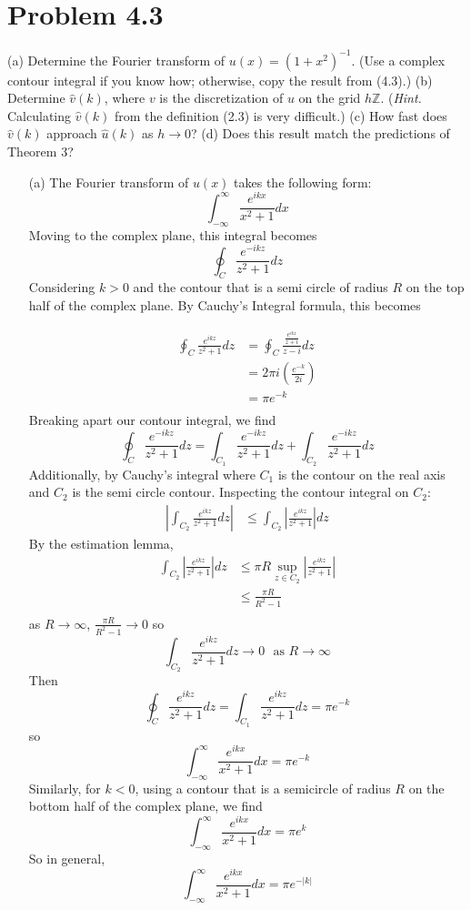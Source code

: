 \documentclass{article}
\begin{document}
\section*{Problem 4.3}
(a) Determine the Fourier transform of $u(x) = (1 + x^2)^{-1}$. (Use a complex contour integral if you know how; otherwise, copy the result from (4.3).) (b) Determine $\hat{v}(k)$, where $v$ is the discretization of $u$ on the grid $h\mathbb{Z}$. (\textit{Hint.} Calculating $\hat{v}(k)$ from the definition (2.3) is very difficult.) (c) How fast does $\hat{v}(k)$ approach $\hat{u}(k)$ as $h \to 0$? (d) Does this result match the predictions of Theorem 3?
\newline\newline
\begin{itemize}
    \item[(a)] The Fourier transform of $u(x)$ takes the following form:
    \[\int_{-\infty}^{\infty}\frac{e^{ikx}}{x^2 + 1}dx\]
    Moving to the complex plane, this integral becomes
    \[\oint_C \frac{e^{-ikz}}{z^2 + 1} dz\]
    Considering $k > 0$ and the contour that is a semi circle of radius $R$ on the top half of the complex plane. By Cauchy's Integral formula, this becomes
    
    \begin{align*}
        \oint_C \frac{e^{ikz}}{z^2+1} dz &= \oint_C \frac{\frac{e^{ikz}}{z+i}}{z-i}dz \\
        &= 2\pi i\left(\frac{e^{-k}}{2i}\right) \\
        &= \pi e^{-k} \\
    \end{align*}
    Breaking apart our contour integral, we find
    \[\oint_C \frac{e^{-ikz}}{z^2+1}dz = \int_{C_1}\frac{e^{-ikz}}{z^2+1}dz + \int_{C_2}\frac{e^{-ikz}}{z^2+1}dz\]
    Additionally, by Cauchy's integral 
    where $C_1$ is the contour on the real axis and $C_2$ is the semi circle contour. Inspecting the contour integral on $C_2$:
    \begin{align*}
        \left|\int_{C_2}\frac{e^{ikz}}{z^2+1}dz\right| &\leq \int_{C_2}\left|\frac{e^{ikz}}{z^2 + 1}\right| dz
    \end{align*}
    By the estimation lemma,
    \begin{align*}
        \int_{C_2}\left|\frac{e^{ikz}}{z^2 + 1}\right| dz &\leq \pi R\sup_{z \in C_2}\left|\frac{e^{ikz}}{z^2+1}\right| \\
        &\leq \frac{\pi R}{R^2 - 1} \\
    \end{align*}
    as $R \to \infty$, $\frac{\pi R}{R^2 - 1} \to 0$ so
    \[\int_{C_2} \frac{e^{ikz}}{z^2+1} dz \to 0 \:\:\: \text{as  } R \to \infty\]
    Then 
    \[\oint_C \frac{e^{ikz}}{z^2 + 1} dz = \int_{C_1} \frac{e^{ikz}}{z^2 + 1}dz = \pi e^{-k}\]
    so
    \[\int_{-\infty}^{\infty}\frac{e^{ikx}}{x^2 + 1}dx = \pi e^{-k}\]
    Similarly, for $k < 0$, using a contour that is a semicircle of radius $R$ on the bottom half of the complex plane, we find
    \[\int_{-\infty}^{\infty}\frac{e^{ikx}}{x^2+1}dx = \pi e^{k}\]
    So in general,
    \[\int_{-\infty}^{\infty}\frac{e^{ikx}}{x^2 + 1}dx = \pi e^{-|k|}\]
    

\end{itemize}
\end{document}
